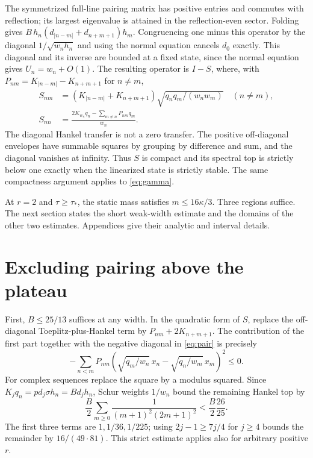 \documentclass[11pt]{article}
\begin{document}
The symmetrized full-line pairing matrix has positive entries and commutes with reflection; its largest eigenvalue is attained in the reflection-even sector. Folding gives $B\,h_n(d_{|n-m|}+d_{n+m+1})h_m$. Congruencing one minus this operator by the diagonal $1/\sqrt{w_n h_n}$ and using the normal equation cancels $d_0$ exactly. This diagonal and its inverse are bounded at a fixed state, since the normal equation gives $U_n=w_n+O(1)$. The resulting operator is $I-S$, where, with $P_{nm}=K_{|n-m|}-K_{n+m+1}$ for $n\ne m$,
\begin{equation}\label{eq:pair}
 \begin{aligned}
 S_{nm}&=(K_{|n-m|}+K_{n+m+1})\sqrt{q_nq_m/(w_nw_m)}\quad(n\ne m),\\
 S_{nn}&=\frac{2K_{w_n}q_n-\sum_{m\ne n}P_{nm}q_m}{w_n}.
 \end{aligned}
\end{equation}
The diagonal Hankel transfer is not a zero transfer. The positive off-diagonal envelopes have summable squares by grouping by difference and sum, and the diagonal vanishes at infinity. Thus $S$ is compact and its spectral top is strictly below one exactly when the linearized state is strictly stable. The same compactness argument applies to \eqref{eq:gamma}.

At $r=2$ and $\tau\ge\tau_*$, the static mass satisfies $m\le16\kappa/3$. Three regions suffice. The next section states the short weak-width estimate and the domains of the other two estimates. Appendices give their analytic and interval details.

\section{Excluding pairing above the plateau}
First, $B\le25/13$ suffices at any width. In the quadratic form of $S$, replace the off-diagonal Toeplitz-plus-Hankel term by $P_{nm}+2K_{n+m+1}$. The contribution of the first part together with the negative diagonal in \eqref{eq:pair} is precisely
\[
 -\sum_{n<m}P_{nm}\left(\sqrt{q_m/w_n}\,x_n-\sqrt{q_n/w_m}\,x_m\right)^2\le0.
\]
For complex sequences replace the square by a modulus squared. Since $K_jq_n=pd_j\sigma h_n=Bd_jh_n$, Schur weights $1/w_n$ bound the remaining Hankel top by
\[
 \frac{B}{2}\sum_{m\ge0}\frac1{(m+1)^2(2m+1)^2}<\frac{B}{2}\frac{26}{25}.
\]
The first three terms are $1,1/36,1/225$; using $2j-1\ge7j/4$ for $j\ge4$ bounds the remainder by $16/(49\cdot81)$. This strict estimate applies also for arbitrary positive $r$.
\end{document}
